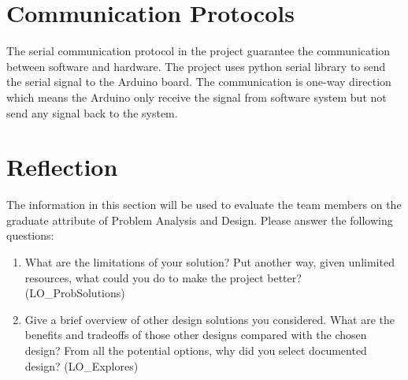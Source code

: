 \documentclass[12pt, titlepage]{article}
\begin{document}
\section{Communication Protocols}
The serial communication protocol in the project guarantee the communication between software and hardware. The project uses python serial library to send the serial signal to the Arduino board. The communication is one-way direction which means the Arduino only receive the signal from software system but not send any signal back to the system.
\section{Reflection}

The information in this section will be used to evaluate the team members on the
graduate attribute of Problem Analysis and Design.  Please answer the following questions:

\begin{enumerate}
  \item What are the limitations of your solution?  Put another way, given
  unlimited resources, what could you do to make the project better? (LO\_ProbSolutions)
  \item Give a brief overview of other design solutions you considered.  What
  are the benefits and tradeoffs of those other designs compared with the chosen
  design?  From all the potential options, why did you select documented design?
  (LO\_Explores)
\end{enumerate}
\end{document}
